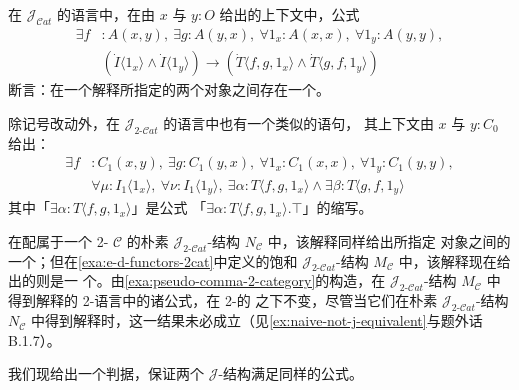 \begin{example}\label{exa:isomorphism-sentence-jcat}
在 $\mathcal{J}_{\mathcal{C}at}$ 的语言中，在由 $x$ 与 $y:O$ 给出的上下文中，公式
\begin{equation*}
\begin{aligned}
\exists f&:A(x,y),\ \exists g:A(y,x),\ \forall 1_{x}:A(x,x),\
\forall 1_{y}:A(y,y),\\
&(\dot{I}\langle 1_{x}\rangle\wedge\dot{I}\langle 1_{y}\rangle)
\to(\dot{T}\langle f,g,1_{x}\rangle\wedge\dot{T}\langle g,f,1_{y}\rangle)
\end{aligned}
\end{equation*}
断言：在一个解释所指定的两个对象之间存在一个\trIsomorphism。
\end{example}

\begin{example}\label{exa:equivalence-sentence-j2cat}
除记号改动外，在 $\mathcal{J}_{2\text{-}\mathcal{C}at}$ 的语言中也有一个类似的语句，
其上下文由 $x$ 与 $y:C_{0}$ 给出：
\begin{equation*}
\begin{aligned}
\exists f&:C_{1}(x,y),\ \exists g:C_{1}(y,x),\ \forall 1_{x}:C_{1}(x,x),\
\forall 1_{y}:C_{1}(y,y),\\
&\forall\mu:I_{1}\langle 1_{x}\rangle,\ \forall\nu:I_{1}\langle 1_{y}\rangle,\
\exists\alpha:T\langle f,g,1_{x}\rangle\wedge\exists\beta:T\langle g,f,1_{y}\rangle
\end{aligned}
\end{equation*}
其中「$\exists\alpha:T\langle f,g,1_{x}\rangle$」是公式
「$\exists\alpha:T\langle f,g,1_{x}\rangle.\top$」的缩写。

在配属于一个 2-\trCategory{} $\mathcal{C}$ 的朴素
$\mathcal{J}_{2\text{-}\mathcal{C}at}$-结构 $N_{\mathcal{C}}$ 中，该解释同样给出所指定
对象之间的一个\trIsomorphism；但在\cref{exa:e-d-functors-2cat}中定义的饱和
$\mathcal{J}_{2\text{-}\mathcal{C}at}$-结构 $M_{\mathcal{C}}$ 中，该解释现在给出的则是一
个\trEquivalence。由\cref{exa:pseudo-comma-2-category}的构造，在
$\mathcal{J}_{2\text{-}\mathcal{C}at}$-结构
$M_{\mathcal{C}}$ 中得到解释的 2-\trCategory{}语言中的诸公式，在 2-\trCategory{}的%
\trBiequivalence{}之下不变，尽管当它们在朴素 $\mathcal{J}_{2\text{-}\mathcal{C}at}$-结构
$N_{\mathcal{C}}$ 中得到解释时，这一结果未必成立（见\cref{ex:naive-not-j-equivalent}与题外话 B.1.7）。
\end{example}

我们现给出一个判据，保证两个 $\mathcal{J}$-结构满足同样的公式。

